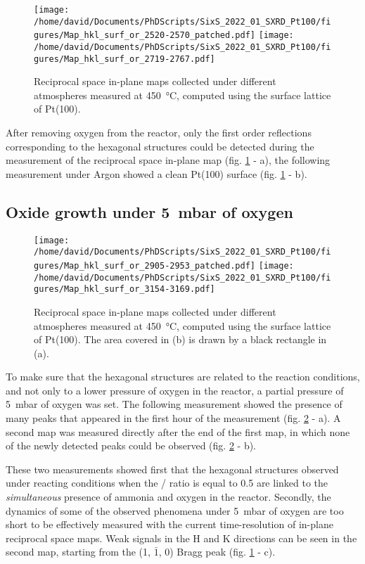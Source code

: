 \begin{figure}[!htb]
    \centering
    \texttt{[image: /home/david/Documents/PhDScripts/SixS\_2022\_01\_SXRD\_Pt100/figures/Map\_hkl\_surf\_or\_2520-2570\_patched.pdf]}
    \texttt{[image: /home/david/Documents/PhDScripts/SixS\_2022\_01\_SXRD\_Pt100/figures/Map\_hkl\_surf\_or\_2719-2767.pdf]}
    \caption{
        Reciprocal space in-plane maps collected under different atmospheres measured at \qty{450}{\degreeCelsius}, computed using the surface lattice of Pt(100).
    }
    \label{fig:MapsPt100C}
\end{figure}

After removing oxygen from the reactor, only the first order reflections corresponding to the hexagonal structures could be detected during the measurement of the reciprocal space in-plane map (fig. \ref{fig:MapsPt100C} - a), the following measurement under Argon showed a clean Pt(100) surface (fig. \ref{fig:MapsPt100C} - b).

\subsection{Oxide growth under \qty{5}{\milli\bar} of oxygen}

\begin{figure}[!htb]
    \centering
    \texttt{[image: /home/david/Documents/PhDScripts/SixS\_2022\_01\_SXRD\_Pt100/figures/Map\_hkl\_surf\_or\_2905-2953\_patched.pdf]}
    \texttt{[image: /home/david/Documents/PhDScripts/SixS\_2022\_01\_SXRD\_Pt100/figures/Map\_hkl\_surf\_or\_3154-3169.pdf]}
    \caption{
        Reciprocal space in-plane maps collected under different atmospheres measured at \qty{450}{\degreeCelsius}, computed using the surface lattice of Pt(100).
        The area covered in (b) is drawn by a black rectangle in (a).
    }
    \label{fig:MapsPt100D}
\end{figure}

To make sure that the hexagonal structures are related to the reaction conditions, and not only to a lower pressure of oxygen in the reactor, a partial pressure of \qty{5}{\milli\bar} of oxygen was set.
The following measurement showed the presence of many peaks that appeared in the first hour of the measurement (fig. \ref{fig:MapsPt100D} - a).
A second map was measured directly after the end of the first map, in which none of the newly detected peaks could be observed (fig. \ref{fig:MapsPt100D} - b).

These two measurements showed first that the hexagonal structures observed under reacting conditions when the / ratio is equal to \num{0.5} are linked to the \textit{simultaneous} presence of ammonia and oxygen in the reactor.
Secondly, the dynamics of some of the observed phenomena under \qty{5}{\milli\bar} of oxygen are too short to be effectively measured with the current time-resolution of in-plane reciprocal space maps.
Weak signals in the H and K directions can be seen in the second map, starting from the (1, $\bar{1}$, 0) Bragg peak (fig. \ref{fig:MapsPt100C} - c).

